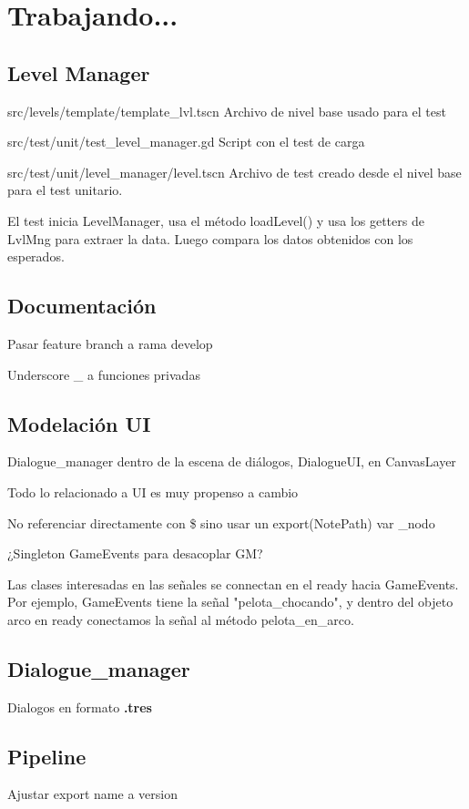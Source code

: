 
\section{Trabajando...}\label{Trabajando}

\subsection{Level Manager}

src/levels/template/template\_lvl.tscn Archivo de nivel base usado para el test

src/test/unit/test\_level\_manager.gd Script con el test de carga

src/test/unit/level\_manager/level.tscn Archivo de test creado desde el nivel base para el test unitario.

El test inicia LevelManager, usa el método loadLevel() y usa los getters de LvlMng para extraer la data. Luego compara los datos obtenidos con los esperados.


\subsection{Documentación}

Pasar feature branch a rama develop

Underscore \_ a funciones privadas

\subsection{Modelación UI}

Dialogue\_manager dentro de la escena de diálogos, DialogueUI, en CanvasLayer

Todo lo relacionado a UI es muy propenso a cambio

No referenciar directamente con \$ sino usar un export(NotePath) var \_nodo

¿Singleton GameEvents para desacoplar GM?

Las clases interesadas en las señales se connectan en el ready hacia GameEvents. Por ejemplo, GameEvents tiene la señal "pelota\_chocando", y dentro del objeto arco en ready conectamos la señal al método pelota\_en\_arco. 

\subsection{Dialogue\_manager}

Dialogos en formato \textbf{.tres}

\subsection{Pipeline}

Ajustar export name a version
